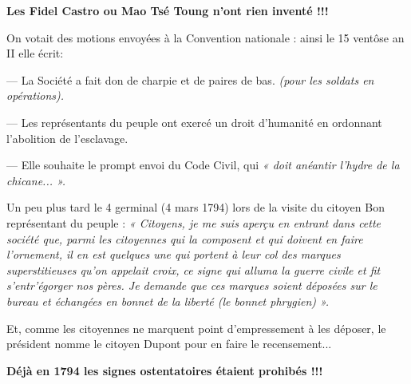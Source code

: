 {\medskip

\textbf{Les Fidel Castro ou Mao Tsé Toung n’ont rien inventé !!!}

On votait des motions envoyées à la Convention nationale : ainsi le 15 ventôse an II elle écrit:

\medskip

--- La Société a fait don de charpie et de paires de bas. \textit{(pour les soldats en opérations).}

--- Les représentants du peuple ont exercé un droit d’humanité en ordonnant l’abolition de l’esclavage.

--- Elle souhaite le prompt envoi du Code Civil, qui \textit{« doit anéantir l’hydre de la chicane... ».}

Un peu plus tard le 4 germinal (4 mars 1794) lors de la visite du citoyen Bon représentant du peuple : \textit{« Citoyens, je me suis aperçu en entrant dans cette société que, parmi les citoyennes qui la composent et qui doivent en faire l’ornement, il en est quelques une qui portent à leur col des marques superstitieuses qu’on appelait croix, ce signe qui alluma la guerre civile et fit s’entr’égorger nos pères. Je demande que ces marques soient déposées sur le bureau et échangées en bonnet de la liberté (le bonnet phrygien) ».}

Et, comme les citoyennes ne marquent point d’empressement à les déposer, le président nomme le citoyen Dupont pour en faire le recensement...

\medskip

\textbf{Déjà en 1794 les signes ostentatoires étaient prohibés !!!}

}

